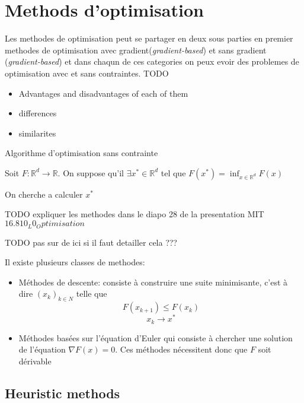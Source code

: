 \chapter{Methods d'optimisation}

Les methodes de optimisation peut se partager en deux sous parties en premier methodes de optimisation avec gradient({\textit{gradient-based}}) et sans gradient ({\textit{gradient-based}}) et dans chaqun de ces categories on peux evoir des problemes de optimisation avec et sans contraintes.
TODO 
\begin{itemize}
    \item Advantages and disadvantages of each of them 
    \item differences 
    \item similarites
\end{itemize}

Algorithme d'optimisation sans contrainte 

Soit $F:\mathbb{R}^d \rightarrow \mathbb{R}$. On suppose qu'il $\exists  x^* \in \mathbb{R}^d$ tel que $F(x^*) = \inf_{x \in \mathbb{R}^d} F(x)$

On cherche a calculer $x^*$

TODO expliquer les methodes dans le diapo 28 de la presentation MIT $16.810_L0_Optimisation$

TODO pas sur de ici si il faut detailler cela ???

Il existe plusieurs classes de methodes:
\begin{itemize}
    \item  Méthodes de descente: consiste à construire une suite minimisante, c'est à dire $(x_k)_{k\in N}$ telle que 
    $$ F(x_{k+1}) \leq F(x_k) $$
    $$x_k \rightarrow x^* $$
    
    \item Méthodes basées sur l'équation d'Euler qui consiste à chercher une solution de l'équation $\nabla F(x) = 0$. Ces méthodes nécessitent donc que $F$ soit dérivable
\end{itemize} 
\section{Heuristic methods}
